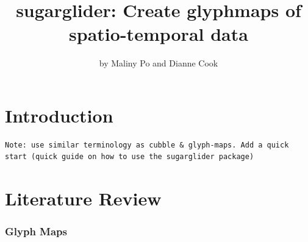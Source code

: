 \title{sugarglider: Create glyphmaps of spatio-temporal data}


\author{by Maliny Po and Dianne Cook}

\maketitle


\hypertarget{introduction}{%
\section{Introduction}\label{introduction}}

\begin{verbatim}
Note: use similar terminology as cubble & glyph-maps. Add a quick start (quick guide on how to use the sugarglider package)
\end{verbatim}

\hypertarget{literature-review}{%
\section{Literature Review}\label{literature-review}}

\hypertarget{glyph-maps}{%
\subsubsection{Glyph Maps}\label{glyph-maps}}

